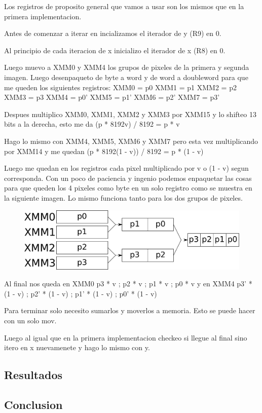 Los registros de proposito general que vamos a usar son los mismos que en la primera implementacion.

Antes de comenzar a iterar en incializamos el iterador de y (R9) en 0.

Al principio de cada iteracion de x inicializo el iterador de x (R8) en 0.

Luego muevo a XMM0 y XMM4 los grupos de pixeles de la primera y segunda imagen. Luego desenpaqueto de byte a word y de word a doubleword para que me queden los siguientes registros:
	XMM0 = p0
	XMM1 = p1
	XMM2 = p2
	XMM3 = p3
	XMM4 = p0'
	XMM5 = p1'
	XMM6 = p2'
	XMM7 = p3'

Despues multiplico XMM0, XMM1, XMM2 y XMM3 por XMM15 y lo shifteo 13 bits a la derecha, esto me da (p * 8192v) / 8192 = p * v

Hago lo mismo con XMM4, XMM5, XMM6 y XMM7 pero esta vez multiplicando por XMM14 y me quedan (p * 8192(1 - v)) / 8192 = p * (1 - v)

Luego me quedan en los registros cada pixel multiplicado por v o (1 - v) segun corresponda. Con un poco de paciencia y ingenio podemos enpaquetar las cosas para que queden los 4 pixeles como byte en un solo registro como se muestra en la siguiente imagen. Lo mismo funciona tanto para los dos grupos de pixeles.

\begin{figure}[h!]
	\centering
	\includegraphics[scale=0.5]{images/MergeASM2_1}
\end{figure}

Al final nos queda en XMM0 p3 * v ; p2 * v ; p1 * v ; p0 * v y en XMM4 p3' * (1 - v) ; p2' * (1 - v) ; p1' * (1 - v) ; p0' * (1 - v)

Para terminar solo necesito sumarlos y moverlos a memoria. Esto se puede hacer con un solo mov.

Luego al igual que en la primera implementacion checkeo si llegue al final sino itero en x nuevamenete y hago lo mismo con y.

\subsection{Resultados}


\subsection{Conclusion}